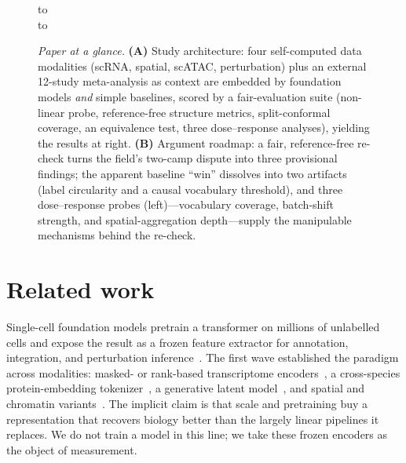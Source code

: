 \documentclass[11pt]{article}
\begin{document}
\begin{figure}[htb]\centering
\hbox to \textwidth{\hfil\normalfont\small\itshape Study architecture\hfil}\vspace{2pt}
\makebox[\textwidth][l]{\hspace*{-14pt}}\\[12pt]
\hbox to \textwidth{\hfil\normalfont\small\itshape Argument roadmap\hfil}\vspace{2pt}
\makebox[\textwidth][l]{}
\caption{\emph{Paper at a glance.} \textbf{(A)} Study architecture: four self-computed data modalities (scRNA, spatial, scATAC, perturbation) plus an external 12-study meta-analysis as context are embedded by foundation models \emph{and} simple baselines, scored by a fair-evaluation suite (non-linear probe, reference-free structure metrics, split-conformal coverage, an equivalence test, three dose--response analyses), yielding the results at right. \textbf{(B)} Argument roadmap: a fair, reference-free re-check turns the field's two-camp dispute into three provisional findings; the apparent baseline ``win'' dissolves into two artifacts (label circularity and a causal vocabulary threshold), and three dose--response probes (left)---vocabulary coverage, batch-shift strength, and spatial-aggregation depth---supply the manipulable mechanisms behind the re-check.}\label{fig:schematic}\end{figure}

\FloatBarrier

\section{Related work}

Single-cell foundation models pretrain a transformer on millions of unlabelled cells and expose the result as a frozen feature extractor for annotation, integration, and perturbation inference~\cite{bommasani2021,vaswani2017}. The first wave established the paradigm across modalities: masked- or rank-based transcriptome encoders~\cite{scgpt2024,geneformer2023,scfoundation2024}, a cross-species protein-embedding tokenizer~\cite{uce2023}, a generative latent model~\cite{cellplm2024}, and spatial and chromatin variants~\cite{nicheformer2025,chromfound2025,atacformer2024,epifoundation2025}. The implicit claim is that scale and pretraining buy a representation that recovers biology better than the largely linear pipelines it replaces. We do not train a model in this line; we take these frozen encoders as the object of measurement.
\end{document}
